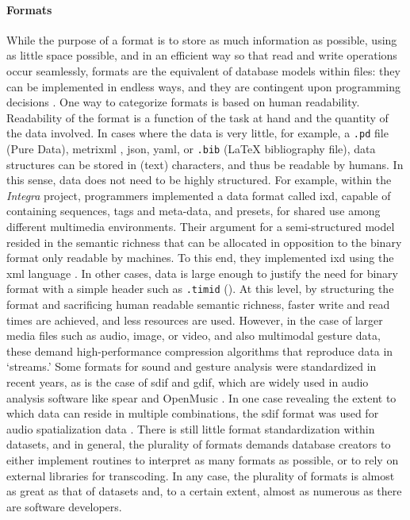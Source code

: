 \documentclass[
]{book}
\newcommand{\obj}[1]{\framebox{{\small\textbf{\texttt{#1}}}}}
\begin{document}
\paragraph{Formats}
While the purpose of a format is to store as much information as possible, using as little space possible, and in an efficient way so that read and write operations occur seamlessly, formats are the equivalent of database models within files: they can be implemented in endless ways, and they are contingent upon programming decisions \parencite[8]{Ste12:MP3}. One way to categorize formats is based on human readability. Readability of the format is a function of the task at hand and the quantity of the data involved. In cases where the data is very little, for example, a \texttt{.pd} file (Pure Data), \gls{metrixml} \parencite{Amatriain/2004/phdthesis}, \gls{json}, \gls{yaml}, or \texttt{.bib} (\LaTeX{} bibliography file), data structures can be stored in (text) characters, and thus be readable by humans. In this sense, data does not need to be highly structured. For example, within the \textit{Integra} project, programmers implemented a data format called \gls{ixd}, capable of containing sequences, tags and meta-data, and presets, for shared use among different multimedia environments. Their argument for a semi-structured model resided in the semantic richness that can be allocated in opposition to the binary format only readable by machines. To this end, they implemented \gls{ixd} using the \gls{xml} language \parencite{icmc/bbp2372.2009.012}. In other cases, data is large enough to justify the need for binary format with a simple header such as \texttt{.timid} (\obj{timbreID}). At this level, by structuring the format and sacrificing human readable semantic richness, faster write and read times are achieved, and less resources are used. However, in the case of larger media files such as audio, image, or video, and also multimodal gesture data, these demand high-performance compression algorithms that reproduce data in `streams.' Some formats for sound and gesture analysis were standardized in recent years, as is the case of \gls{sdif} and \gls{gdif}, which are widely used in audio analysis software like \gls{spear} and OpenMusic \parencites{icmc/bbp2372.2004.004}{kristian_nymoen_2011_849865}. In one case revealing the extent to which data can reside in multiple combinations, the \gls{sdif} format was used for audio spatialization data \parencite{icmc/bbp2372.2004.004}. There is still little format standardization within datasets, and in general, the plurality of formats demands database creators to either implement routines to interpret as many formats as possible, or to rely on external libraries for transcoding. In any case, the plurality of formats is almost as great as that of datasets and, to a certain extent, almost as numerous as there are software developers.
\end{document}
